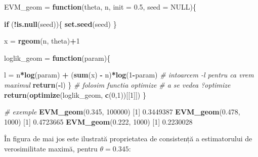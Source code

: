 \documentclass[]{article}
\newenvironment{Shaded}{\begin{snugshade}}{\end{snugshade}}
\newcommand{\CommentTok}[1]{\textcolor[rgb]{0.56,0.35,0.01}{\textit{#1}}}
\newcommand{\ControlFlowTok}[1]{\textcolor[rgb]{0.13,0.29,0.53}{\textbf{#1}}}
\newcommand{\DataTypeTok}[1]{\textcolor[rgb]{0.13,0.29,0.53}{#1}}
\newcommand{\DecValTok}[1]{\textcolor[rgb]{0.00,0.00,0.81}{#1}}
\newcommand{\FloatTok}[1]{\textcolor[rgb]{0.00,0.00,0.81}{#1}}
\newcommand{\KeywordTok}[1]{\textcolor[rgb]{0.13,0.29,0.53}{\textbf{#1}}}
\newcommand{\NormalTok}[1]{#1}
\newcommand{\OperatorTok}[1]{\textcolor[rgb]{0.81,0.36,0.00}{\textbf{#1}}}
\newcommand{\OtherTok}[1]{\textcolor[rgb]{0.56,0.35,0.01}{#1}}
\newcommand{\StringTok}[1]{\textcolor[rgb]{0.31,0.60,0.02}{#1}}
\begin{document}
\begin{Shaded}
\begin{Highlighting}[]
\NormalTok{EVM_geom =}\StringTok{ }\ControlFlowTok{function}\NormalTok{(theta, n, }\DataTypeTok{init =} \FloatTok{0.5}\NormalTok{, }\DataTypeTok{seed =} \OtherTok{NULL}\NormalTok{)\{}
  
  \ControlFlowTok{if}\NormalTok{ (}\OperatorTok{!}\KeywordTok{is.null}\NormalTok{(seed))\{}
    \KeywordTok{set.seed}\NormalTok{(seed)}
\NormalTok{  \}}
  
\NormalTok{  x =}\StringTok{ }\KeywordTok{rgeom}\NormalTok{(n, theta)}\OperatorTok{+}\DecValTok{1}
  
\NormalTok{  loglik_geom =}\StringTok{ }\ControlFlowTok{function}\NormalTok{(param)\{}
    
\NormalTok{    l =}\StringTok{ }\NormalTok{n}\OperatorTok{*}\KeywordTok{log}\NormalTok{(param) }\OperatorTok{+}\StringTok{ }\NormalTok{(}\KeywordTok{sum}\NormalTok{(x) }\OperatorTok{-}\StringTok{ }\NormalTok{n)}\OperatorTok{*}\KeywordTok{log}\NormalTok{(}\DecValTok{1}\OperatorTok{-}\NormalTok{param)}
    \CommentTok{# intoarcem -l pentru ca vrem maximul}
    \KeywordTok{return}\NormalTok{(}\OperatorTok{-}\NormalTok{l)}
\NormalTok{  \}}
  \CommentTok{# folosim functia optimize}
  \CommentTok{# a se vedea ?optimize}
  \KeywordTok{return}\NormalTok{(}\KeywordTok{optimize}\NormalTok{(loglik_geom, }\KeywordTok{c}\NormalTok{(}\DecValTok{0}\NormalTok{,}\DecValTok{1}\NormalTok{))[[}\DecValTok{1}\NormalTok{]])}
\NormalTok{\}}

\CommentTok{# exemple}
\KeywordTok{EVM_geom}\NormalTok{(}\FloatTok{0.345}\NormalTok{, }\DecValTok{100000}\NormalTok{)}
\NormalTok{[}\DecValTok{1}\NormalTok{] }\FloatTok{0.3449387}
\KeywordTok{EVM_geom}\NormalTok{(}\FloatTok{0.478}\NormalTok{, }\DecValTok{1000}\NormalTok{)}
\NormalTok{[}\DecValTok{1}\NormalTok{] }\FloatTok{0.4723665}
\KeywordTok{EVM_geom}\NormalTok{(}\FloatTok{0.222}\NormalTok{, }\DecValTok{1000}\NormalTok{)}
\NormalTok{[}\DecValTok{1}\NormalTok{] }\FloatTok{0.2230028}
\end{Highlighting}
\end{Shaded}

În figura de mai jos este ilustrată proprietatea de consistență a
estimatorului de verosimilitate maximă, pentru \(\theta = 0.345\):
\end{document}
